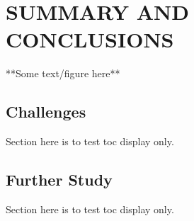 %
%
%



\chapter{SUMMARY AND CONCLUSIONS \label{cha:Summary}}

**Some text/figure here**

\section{Challenges}
Section here is to test toc display only.

\section{Further Study}
Section here is to test toc display only.

